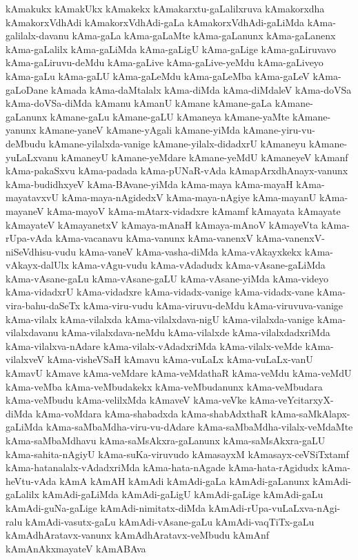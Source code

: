 {kAmakukx
kAmakUkx
kAmakekx
kAmakarxtu-gaLalilxruva
kAmakorxdha
kAmakorxVdhAdi
kAmakorxVdhAdi-gaLa
kAmakorxVdhAdi-gaLiMda
kAma-galilalx-davanu
kAma-gaLa
kAma-gaLaMte
kAma-gaLanunx
kAma-gaLanenx
kAma-gaLalilx
kAma-gaLiMda
kAma-gaLigU
kAma-gaLige
kAma-gaLiruvavo
kAma-gaLiruvu-deMdu
kAma-gaLive
kAma-gaLive-yeMdu
kAma-gaLiveyo
kAma-gaLu
kAma-gaLU
kAma-gaLeMdu
kAma-gaLeMba
kAma-gaLeV
kAma-gaLoDane
kAmada
kAma-daMtalalx
kAma-diMda
kAma-diMdaleV
kAma-doVSa
kAma-doVSa-diMda
kAmanu
kAmanU
kAmane
kAmane-gaLa
kAmane-gaLanunx
kAmane-gaLu
kAmane-gaLU
kAmaneya
kAmane-yaMte
kAmane-yanunx
kAmane-yaneV
kAmane-yAgali
kAmane-yiMda
kAmane-yiru-vu-deMbudu
kAmane-yilalxda-vanige
kAmane-yilalx-didadxrU
kAmaneyu
kAmane-yuLaLxvanu
kAmaneyU
kAmane-yeMdare
kAmane-yeMdU
kAmaneyeV
kAmanf
kAma-pakaSxvu
kAma-padada
kAma-pUNaR-vAda
kAmapArxdhAnayx-vanunx
kAma-budidhxyeV
kAma-BAvane-yiMda
kAma-maya
kAma-mayaH
kAma-mayatavxvU
kAma-maya-nAgidedxV
kAma-maya-nAgiye
kAma-mayanU
kAma-mayaneV
kAma-mayoV
kAma-mAtarx-vidadxre
kAmamf
kAmayata
kAmayate
kAmayateV
kAmayanetxV
kAmaya-mAnaH
kAmaya-mAnoV
kAmayeVta
kAma-rUpa-vAda
kAma-vacanavu
kAma-vanunx
kAma-vanenxV
kAma-vanenxV-niSeVdhisu-vudu
kAma-vaneV
kAma-vasha-diMda
kAma-vAkayxkekx
kAma-vAkayx-dalUlx
kAma-vAgu-vudu
kAma-vAdadudx
kAma-vAsane-gaLiMda
kAma-vAsane-gaLu
kAma-vAsane-gaLU
kAma-vAsane-yiMda
kAma-videyo
kAma-vidadxrU
kAma-vidadxre
kAma-vidadx-vanige
kAma-vidadx-vane
kAma-vira-bahu-daSeTx
kAma-viru-vudu
kAma-viruvu-deMdu
kAma-viruvuva-vanige
kAma-vilalx
kAma-vilalxda
kAma-vilalxdava-nigU
kAma-vilalxda-vanige
kAma-vilalxdavanu
kAma-vilalxdava-neMdu
kAma-vilalxde
kAma-vilalxdadxriMda
kAma-vilalxva-nAdare
kAma-vilalx-vAdadxriMda
kAma-vilalx-veMde
kAma-vilalxveV
kAma-visheVSaH
kAmavu
kAma-vuLaLx
kAma-vuLaLx-vanU
kAmavU
kAmave
kAma-veMdare
kAma-veMdathaR
kAma-veMdu
kAma-veMdU
kAma-veMba
kAma-veMbudakekx
kAma-veMbudanunx
kAma-veMbudara
kAma-veMbudu
kAma-velilxMda
kAmaveV
kAma-veVke
kAma-veYcitarxyX-diMda
kAma-voMdara
kAma-shabadxda
kAma-shabAdxthaR
kAma-saMkAlapx-gaLiMda
kAma-saMbaMdha-viru-vu-dAdare
kAma-saMbaMdha-vilalx-veMdaMte
kAma-saMbaMdhavu
kAma-saMsAkxra-gaLanunx
kAma-saMsAkxra-gaLU
kAma-sahita-nAgiyU
kAma-suKa-viruvudo
kAmasayxM
kAmasayx-ceVSiTxtamf
kAma-hatanalalx-vAdadxriMda
kAma-hata-nAgade
kAma-hata-rAgidudx
kAma-heVtu-vAda
kAmA
kAmAH
kAmAdi
kAmAdi-gaLa
kAmAdi-gaLanunx
kAmAdi-gaLalilx
kAmAdi-gaLiMda
kAmAdi-gaLigU
kAmAdi-gaLige
kAmAdi-gaLu
kAmAdi-guNa-gaLige
kAmAdi-nimitatx-diMda
kAmAdi-rUpa-vuLaLxva-nAgi-ralu
kAmAdi-vasutx-gaLu
kAmAdi-vAsane-gaLu
kAmAdi-vaqTiTx-gaLu
kAmAdhAratavx-vanunx
kAmAdhAratavx-veMbudu
kAmAnf
kAmAnAkxmayateV
kAmABAva
}
